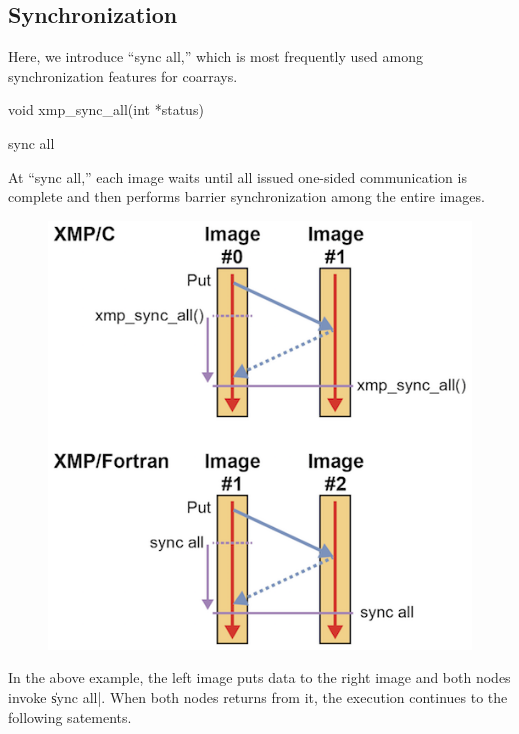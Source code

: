\subsection{Synchronization}

Here, we introduce ``sync all,'' which is most frequently used among
synchronization features for coarrays.

\begin{XCexample}
void xmp_sync_all(int *status)
\end{XCexample}

\begin{XFexample}
sync all
\end{XFexample}

At ``sync all,'' each image waits until all issued one-sided
communication is complete and then performs barrier synchronization
among the entire images.

\begin{figure}
  \centering
  \includegraphics{figs/sync_all.png}
\end{figure}

In the above example, the left image puts data to the right image and
both nodes invoke \|sync all|. When both nodes returns from it, the
execution continues to the following satements.


